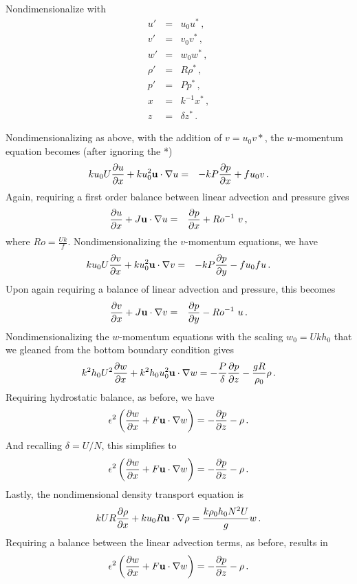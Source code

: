 \documentclass[12pt]{article}
\begin{document}
Nondimensionalize with
\begin{eqnarray*}
	u' &=& u_0 u^*\,,\\
	v' &=& v_0 v^*\,,\\
	w' &=& w_0 w^*\,,\\
	\rho' &=& R \rho^*\,,\\
	p' &=& P p^*\,,\\
	x &=& k^{-1} x^*\,,\\
	z &=& \delta z^*\,.
\end{eqnarray*}

Nondimensionalizing as above, with the addition of $v = u_0v*$, the $u$-momentum equation becomes (after ignoring the *)
\begin{eqnarray*}
k u_0 U \frac{\partial{u}}{\partial{x}} + k u_0^2\mathbf{u}\cdot\nabla u  &=& -k P \frac{\partial{p}}{\partial{x}} + fu_0v\,.
\end{eqnarray*}
Again, requiring a first order balance between linear advection and pressure gives
\begin{eqnarray*}
\frac{\partial{u}}{\partial{x}} + J\mathbf{u}\cdot\nabla u  &=& \frac{\partial{p}}{\partial{x}} +Ro^{-1} \ v \,,
\end{eqnarray*}
where $Ro =  \frac{Uk}{f}$.
Nondimensionalizing the $v$-momentum equations, we have
\begin{eqnarray*}
k u_0 U  \frac{\partial{v}}{\partial{x}} +k u_0^2 \mathbf{u}\cdot\nabla v &=& -k P\frac{\partial{p}}{\partial{y}} - fu_0fu \,.
\end{eqnarray*}
Upon again requiring a balance of linear advection and pressure, this becomes
\begin{eqnarray*}
	\frac{\partial{v}}{\partial{x}} + J\mathbf{u}\cdot\nabla v  &=& \frac{\partial{p}}{\partial{y}} - Ro^{-1} \ u \,.
\end{eqnarray*}
Nondimensionalizing the $w$-momentum equations with the scaling $w_0 = Uk h_0$ that we gleaned from the bottom boundary condition gives
\[
k^2 h_0 U^2 \frac{\partial{w}}{\partial{x}} + k^2 h_0 u_0^2\mathbf{u}\cdot\nabla w = -\frac{P}{\delta}\frac{\partial{p}}{\partial{z}} - \frac{g R}{\rho_0} \rho \,.
\]
Requiring hydrostatic balance, as before, we have
\[
\epsilon^2 \left(\frac{\partial{w}}{\partial{x}} + F\mathbf{u}\cdot\nabla w\right) = -\frac{\partial{p}}{\partial{z}} - \rho \,.
\]
And recalling $\delta = U/N$, this simplifies to 
\[
\epsilon^2 \left(\frac{\partial{w}}{\partial{x}} + F\mathbf{u}\cdot\nabla w\right) = -\frac{\partial{p}}{\partial{z}} - \rho\,.
\]
Lastly, the nondimensional density transport equation is
\[
k U R \frac{\partial{\rho}}{\partial{x}} + k u_0 R \mathbf{u}\cdot\nabla\rho = \frac{k \rho_0 h_0 N^2 U}{g} w\,.
\]
Requiring a balance between the linear advection terms, as before, results in
\[
\epsilon^2 \left(\frac{\partial{w}}{\partial{x}} + F\mathbf{u}\cdot\nabla w\right) = -\frac{\partial{p}}{\partial{z}} - \rho\,.
\]



\end{document}
